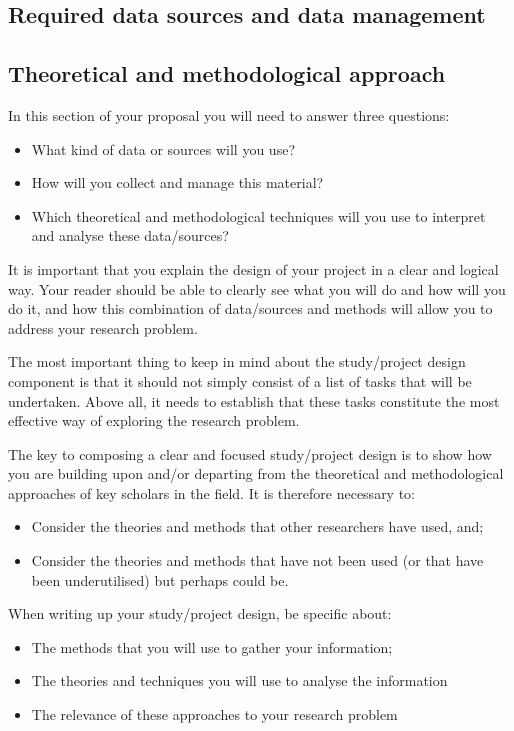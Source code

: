 \documentclass[12pt, a4paper]{article}
\begin{document}
\subsection{Required data sources and data management}

\subsection{Theoretical and methodological approach}



In this section of your proposal you will need to answer three questions:
\begin{itemize}
\item What kind of data or sources will you use?
\item How will you collect and manage this material?
\item Which theoretical and methodological techniques will you use to interpret and analyse these data/sources?
\end{itemize}

It is important that you explain the design of your project in a clear and logical way. Your reader should be able to clearly see what you will do and how will you do it, and how this combination of data/sources and methods will allow you to address your research problem.


The most important thing to keep in mind about the study/project design component is that it should not simply consist of a list of tasks that will be undertaken. Above all, it needs to establish that these tasks constitute the most effective way of exploring the research problem.

The key to composing a clear and focused study/project design is to show how you are building upon and/or departing from the theoretical and methodological approaches of key scholars in the field. It is therefore necessary to:
\begin{itemize}
\item Consider the theories and methods that other researchers have used, and;
\item Consider the theories and methods that have not been used (or that have been underutilised) but perhaps could be.
\end{itemize}

When writing up your study/project design, be specific about:
\begin{itemize}
\item The methods that you will use to gather your information;
\item The theories and techniques you will use to analyse the information
\item The relevance of these approaches to your research problem
\end{itemize}
\end{document}
